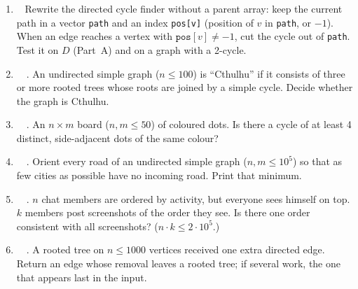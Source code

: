 \exlegend
\begin{enumerate}[leftmargin=*, label=\textbf{E1.\arabic*}, itemsep=6pt]
    \item \exeasy\ \pconcept {} Rewrite the directed cycle finder without a parent array: keep the current path in a vector \texttt{path} and an index \texttt{pos[v]} (position of $v$ in \texttt{path}, or $-1$). When an edge reaches a vertex with $\texttt{pos}[v] \ne -1$, cut the cycle out of \texttt{path}. Test it on $D$ (Part~A) and on a graph with a 2-cycle.
    \item \exeasy\ \pclassic {}\ . An undirected simple graph ($n \le 100$) is ``Cthulhu'' if it consists of three or more rooted trees whose roots are joined by a simple cycle. Decide whether the graph is Cthulhu.
    \item \exmedium\ \pclassic {}\ . An $n \times m$ board ($n, m \le 50$) of coloured dots. Is there a cycle of at least 4 distinct, side-adjacent dots of the same colour?
    \item \exmedium\ \ptricky {}\ . Orient every road of an undirected simple graph ($n, m \le 10^5$) so that as few cities as possible have no incoming road. Print that minimum.
    \item \exhard\ \precent {}\ . $n$ chat members are ordered by activity, but everyone sees himself on top. $k$ members post screenshots of the order they see. Is there one order consistent with all screenshots? ($n \cdot k \le 2\cdot10^5$.)
    \item \exhard\ \ptricky {}\ . A rooted tree on $n \le 1000$ vertices received one extra directed edge. Return an edge whose removal leaves a rooted tree; if several work, the one that appears last in the input.
\end{enumerate}

